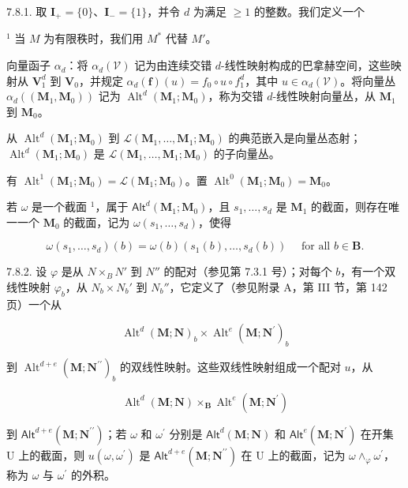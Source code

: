 7.8.1. 取 \(\mathbf{I}_{+} = \{0\}\)、\(\mathbf{I}_{-} = \{1\}\)，并令 \(d\) 为满足 \(\geqslant 1\) 的整数。我们定义一个

\(^{1}\) 当 \(M\) 为有限秩时，我们用 \(M^{*}\) 代替 \(M'\)。

向量函子 \(\alpha_{d}\)：将 \(\alpha_{d}(\mathcal{V})\) 记为由连续交错 \(d\)-线性映射构成的巴拿赫空间，这些映射从 \(\mathbf{V}_{1}^{d}\) 到 \(\mathbf{V}_{0}\)，并规定 \(\alpha_{d}(\mathbf{f})(u) = f_{0} \circ u \circ f_{1}^{d}\)，其中 \(u \in \alpha_{d}(\mathcal{V})\)。将向量丛 \(\alpha_{d}((\mathbf{M}_{1}, \mathbf{M}_{0}))\) 记为 \(\operatorname{Alt}^{d}(\mathbf{M}_{1}; \mathbf{M}_{0})\)，称为交错 \(d\)-线性映射向量丛，从 \(\mathbf{M}_{1}\) 到 \(\mathbf{M}_{0}\)。

从 \(\operatorname{Alt}^{d}(\mathbf{M}_{1};\mathbf{M}_{0})\) 到 \(\mathcal{L}(\mathbf{M}_{1},\ldots,\mathbf{M}_{1};\mathbf{M}_{0})\) 的典范嵌入是向量丛态射；\(\operatorname{Alt}^{d}(\mathbf{M}_{1};\mathbf{M}_{0})\) 是 \(\mathcal{L}(\mathbf{M}_{1},\ldots,\mathbf{M}_{1};\mathbf{M}_{0})\) 的子向量丛。

有 \(\operatorname{Alt}^1 (\mathbf{M}_1;\mathbf{M}_0) = \mathcal{L}(\mathbf{M}_1;\mathbf{M}_0)\)。置 \(\operatorname{Alt}^0 (\mathbf{M}_1;\mathbf{M}_0) = \mathbf{M}_0\)。

若 \(\omega\) 是一个截面 \(^{1}\)，属于 \(\mathsf{Alt}^{d}(\mathbf{M}_{1};\mathbf{M}_{0})\)，且 \(s_{1},\ldots,s_{d}\) 是 \(\mathbf{M}_{1}\) 的截面，则存在唯一一个 \(\mathbf{M}_{0}\) 的截面，记为 \(\omega(s_{1},\ldots,s_{d})\)，使得

\[
\omega (s _ {1}, \dots , s _ {d}) (b) = \omega (b) (s _ {1} (b), \dots , s _ {d} (b)) \quad \text { for all } b \in \mathbf {B}.
\]

7.8.2. 设 \(\varphi\) 是从 \(N \times_{B} N'\) 到 \(N''\) 的配对（参见第 7.3.1 号）；对每个 \(b\)，有一个双线性映射 \(\varphi_b\)，从 \(N_b \times N_b'\) 到 \(N_b''\)，它定义了（参见附录 A，第 III 节，第 142 页）一个从

\[
\operatorname{Alt} ^ {d} (\mathbf {M}; \mathbf {N}) _ {b} \times \operatorname{Alt} ^ {e} (\mathbf {M}; \mathbf {N} ^ {\prime}) _ {b}
\]

到 \(\operatorname{Alt}^{d + e}(\mathbf{M};\mathbf{N}^{\prime \prime})_{b}\) 的双线性映射。这些双线性映射组成一个配对 \(u\)，从

\[
\operatorname{Alt} ^ {d} (\mathbf {M}; \mathbf {N}) \times_ {\mathbf {B}} \operatorname{Alt} ^ {e} (\mathbf {M}; \mathbf {N} ^ {\prime})
\]

到 \(\mathsf{Alt}^{d + e}(\mathbf{M};\mathbf{N}^{\prime \prime})\)；若 \(\omega\) 和 \(\omega^{\prime}\) 分别是 \(\mathsf{Alt}^{d}(\mathbf{M};\mathbf{N})\) 和 \(\mathsf{Alt}^{e}(\mathbf{M};\mathbf{N}^{\prime})\) 在开集 U 上的截面，则 \(u(\omega ,\omega^{\prime})\) 是 \(\mathsf{Alt}^{d + e}(\mathbf{M};\mathbf{N}^{\prime \prime})\) 在 U 上的截面，记为 \(\omega \wedge_{\varphi}\omega^{\prime}\)，称为 \(\omega\) 与 \(\omega^{\prime}\) 的外积。

